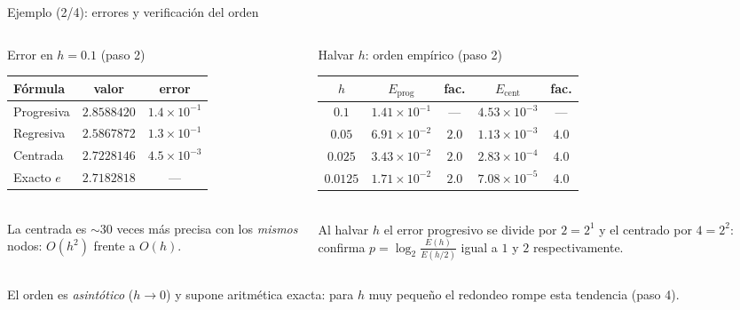 \documentclass[aspectratio=169,10pt]{beamer}
\begin{document}
\begin{frame}{Ejemplo (2/4): errores y verificación del orden}
\begin{columns}[T]
\begin{column}{0.44\textwidth}
\begin{cardgear}{Error en $h=0.1$ (paso 2)}{\faTable}
\centering
{\footnotesize\renewcommand{\arraystretch}{1.4}\setlength{\tabcolsep}{5pt}
\begin{tabular}{l|c|c}
Fórmula & valor & error\\\hline
Progresiva & $2.8588420$ & $1.4{\times}10^{-1}$\\
Regresiva & $2.5867872$ & $1.3{\times}10^{-1}$\\
Centrada & $2.7228146$ & $4.5{\times}10^{-3}$\\\hline
Exacto $e$ & $2.7182818$ & —\\
\end{tabular}}\\[1.2mm]
{\footnotesize La centrada es $\sim30$ veces más precisa con los \emph{mismos} nodos: $O(h^2)$ frente a $O(h)$.}
\end{cardgear}
\end{column}
\begin{column}{0.54\textwidth}
\begin{cardgear}{Halvar $h$: orden empírico (paso 2)}{\faTable}
\centering
{\footnotesize\renewcommand{\arraystretch}{1.32}\setlength{\tabcolsep}{5pt}
\begin{tabular}{c|cc|cc}
$h$ & $E_{\text{prog}}$ & fac. & $E_{\text{cent}}$ & fac.\\\hline
$0.1$   & $1.41{\times}10^{-1}$ & —   & $4.53{\times}10^{-3}$ & —\\
$0.05$  & $6.91{\times}10^{-2}$ & $2.0$ & $1.13{\times}10^{-3}$ & $4.0$\\
$0.025$ & $3.43{\times}10^{-2}$ & $2.0$ & $2.83{\times}10^{-4}$ & $4.0$\\
$0.0125$& $1.71{\times}10^{-2}$ & $2.0$ & $7.08{\times}10^{-5}$ & $4.0$\\
\end{tabular}}\\[1.4mm]
{\footnotesize Al halvar $h$ el error progresivo se divide por $2=2^1$ y el centrado por $4=2^2$: confirma $p=\log_2\!\frac{E(h)}{E(h/2)}$ igual a $1$ y $2$ respectivamente.}
\end{cardgear}
\end{column}
\end{columns}
\vspace{1.5mm}
\begin{cardnota}[\faExclamationTriangle]
{\footnotesize El orden es \emph{asintótico} ($h\to0$) y supone aritmética exacta: para $h$ muy pequeño el redondeo rompe esta tendencia (paso 4).}
\end{cardnota}
\end{frame}
\end{document}

